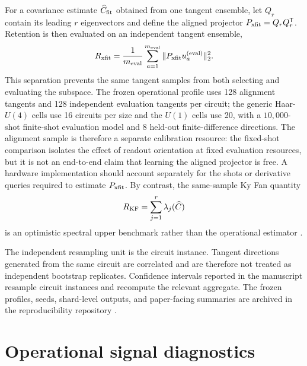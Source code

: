 \documentclass[aps,pra,reprint,superscriptaddress,nofootinbib,longbibliography]{revtex4-2}
\begin{document}
For a covariance estimate $\widehat C_{\rm fit}$ obtained from one tangent ensemble, let $Q_r$ contain its leading $r$ eigenvectors and define the aligned projector $P_{\rm xfit}=Q_rQ_r^{\mathsf T}$.  Retention is then evaluated on an independent tangent ensemble,
\begin{equation}
 R_{\rm xfit}=\frac1{m_{\rm eval}}\sum_{a=1}^{m_{\rm eval}}
\|P_{\rm xfit}u_a^{\rm(eval)}\|_2^2.
\label{eq:app-crossfit}
\end{equation}
This separation prevents the same tangent samples from both selecting and evaluating the subspace. The frozen operational profile uses 128 alignment tangents and 128 independent evaluation tangents per circuit; the generic Haar-$U(4)$ cells use 16 circuits per size and the $U(1)$ cells use 20, with a $10,000$-shot finite-shot evaluation model and 8 held-out finite-difference directions. The alignment sample is therefore a separate calibration resource: the fixed-shot comparison isolates the effect of readout orientation at fixed evaluation resources, but it is not an end-to-end claim that learning the aligned projector is free. A hardware implementation should account separately for the shots or derivative queries required to estimate $P_{\rm xfit}$.  By contrast, the same-sample Ky Fan quantity
\begin{equation}
 R_{\rm KF}=\sum_{j=1}^r\lambda_j(\widehat C)
\end{equation}
is an optimistic spectral upper benchmark rather than the operational estimator \cite{KyFan1949}.

The independent resampling unit is the circuit instance.  Tangent directions generated from the same circuit are correlated and are therefore not treated as independent bootstrap replicates.  Confidence intervals reported in the manuscript resample circuit instances and recompute the relevant aggregate.  The frozen profiles, seeds, shard-level outputs, and paper-facing summaries are archived in the reproducibility repository \cite{AitHaddou2026MeasurementAccessible}.

\section{Operational signal diagnostics}
\label{app:operational}
\end{document}
